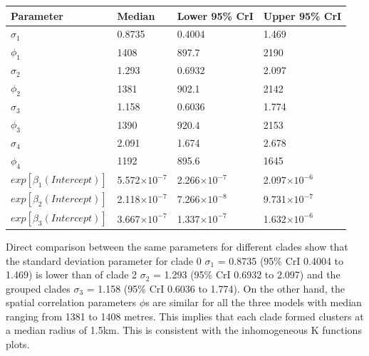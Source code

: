 \begin{spacing}{0.8}
     \label{tab:multivariate-spatial-model}
    \begin{longtable}{p{1.3in}p{1.3in}p{1.3in}p{1.3in}}
        \toprule
        Parameter                 & Median               & Lower 95\% CrI       & Upper 95\% CrI       \\ \midrule
        $\sigma_1$                & 0.8735               & 0.4004               & 1.469                \\
        $\phi_1$                  & 1408                 & 897.7                & 2190                 \\
        $\sigma_2$                & 1.293                & 0.6932               & 2.097                \\
        $\phi_2$                  & 1381                 & 902.1                & 2142                 \\
        $\sigma_3$                & 1.158                & 0.6036               & 1.774                \\
        $\phi_3$                  & 1390                 & 920.4                & 2153                 \\
        $\sigma_4$                & 2.091                & 1.674                & 2.678                \\
        $\phi_4$                  & 1192                 & 895.6                & 1645                 \\
        $exp[\beta_1(Intercept)]$ & 5.572$\times10^{-7}$ & 2.266$\times10^{-7}$ & 2.097$\times10^{-6}$ \\
        $exp[\beta_2(Intercept)]$ & 2.118$\times10^{-7}$ & 7.266$\times10^{-8}$ & 9.731$\times10^{-7}$ \\
        $exp[\beta_3(Intercept)]$ & 3.667$\times10^{-7}$ & 1.337$\times10^{-7}$ & 1.632$\times10^{-6}$ \\
        \bottomrule
    \end{longtable}
\end{spacing}

\hspace*{0.2pt}

Direct comparison between the same parameters for different clades show that the standard deviation parameter for clade 0 $\sigma_1$ = 0.8735 (95\% CrI 0.4004 to 1.469) is lower than of clade 2 $\sigma_2$ = 1.293 (95\% CrI 0.6932 to 2.097) and the grouped clades $\sigma_3$ = 1.158 (95\% CrI 0.6036 to 1.774). On the other hand, the spatial correlation parameters $\phi$s are similar for all the three models with median ranging from 1381 to 1408 metres. This implies that each clade formed clusters at a median radius of 1.5km. This is consistent with the inhomogeneous K functions plots.


